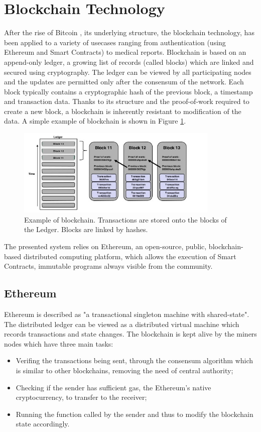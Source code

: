\documentclass[conference,compsoc]{IEEEtran}
\begin{document}
\section{Blockchain Technology}
After the rise of Bitcoin \cite{nakamoto2008bitcoin}, its underlying structure, the blockchain technology, has been applied to a variety of usecases ranging from authentication \cite{sundararajanonline} (using Ethereum and Smart Contracts) to medical reports\cite{azaria2016medrec}. Blockchain is based on an append-only ledger, a growing list of records (called blocks) which are linked and secured using cryptography. The ledger can be viewed by all participating nodes and the updates are permitted only after the consensum of the network. Each block typically contains a cryptographic hash of the previous block, a timestamp and transaction data. Thanks to its structure and the proof-of-work required to create a new block, a blockchain is inherently resistant to modification of the data. A simple example of blockchain is shown in Figure \ref{fig:blockchain}.\\
\begin{figure}[!h]
	\centering
	\includegraphics[width=3.8in]{images/blockchain.jpg}
	
	\caption{Example of blockchain. Transactions are stored onto the blocks of the Ledger. Blocks are linked by hashes.}
	\label{fig:blockchain}
\end{figure} 

The presented system relies on Ethereum, an open-source, public, blockchain-based distributed computing platform, which allows the execution of Smart Contracts, immutable programs always visible from the community.


\subsection{Ethereum}
Ethereum \cite{wood2014ethereum} is described as "a transactional singleton machine with shared-state". 
The distributed ledger can be viewed as a distributed virtual machine which records transactions and state changes.
The blockchain is kept alive by the miners nodes which have three main tasks:
\begin{itemize}
	\item Verifing the transactions being sent, through the consensum algorithm which is similar to other blockchains, removing the need of central authority;
	\item Checking if the sender has sufficient gas, the Ethereum's native cryptocurrency, to transfer to the receiver;
	\item Running the function called by the sender and thus to modify the blockchain state accordingly. 
\end{itemize}
\end{document}
